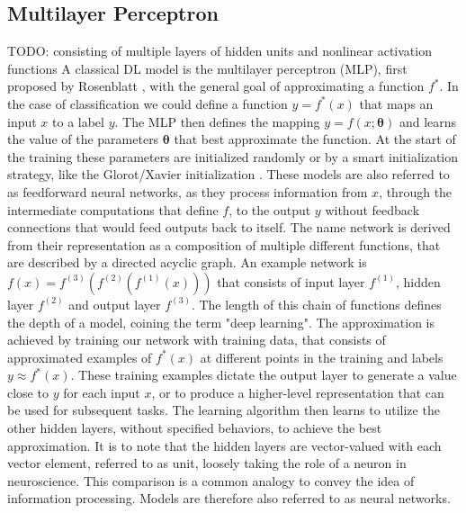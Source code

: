 \subsection{Multilayer Perceptron}
TODO: consisting of multiple layers of hidden units and nonlinear activation functions
A classical DL model is the multilayer perceptron (MLP), first proposed by Rosenblatt \cite{rosenblatt1958perceptron}, with the general goal of approximating a function $f^*$. In the case of classification we could define a function $y = f^*(x)$ that maps an input $x$ to a label $y$. The MLP then defines the mapping $y = f(x;\boldsymbol{\theta})$ and learns the value of the parameters $\boldsymbol{\theta}$ that best approximate the function. At the start of the training these parameters are initialized randomly or by a smart initialization strategy, like the Glorot/Xavier initialization \cite{glorot2010understanding}. These models are also referred to as feedforward neural networks, as they process information from $x$, through the intermediate computations that define $f$, to the output $y$ without feedback connections that would feed outputs back to itself. The name network is derived from their representation as a composition of multiple different functions, that are described by a directed acyclic graph. An example network is $f(x) = f^{(3)}(f^{(2)}(f^{(1)}(x)))$ that consists of input layer $f^{(1)}$, hidden layer $f^{(2)}$ and output layer $f^{(3)}$. The length of this chain of functions defines the depth of a model, coining the term "deep learning". The approximation is achieved by training our network with training data, that consists of approximated examples of $f^*(x)$ at different points in the training and labels $y\approx f^*(x)$. These training examples dictate the output layer to generate a value close to $y$ for each input $x$, or to produce a higher-level representation that can be used for subsequent tasks. The learning algorithm then learns to utilize the other hidden layers, without specified behaviors, to achieve the best approximation. It is to note that the hidden layers are vector-valued with each vector element, referred to as unit, loosely taking the role of a neuron in neuroscience. This comparison is a common analogy to convey the idea of information processing. Models are therefore also referred to as neural networks.


